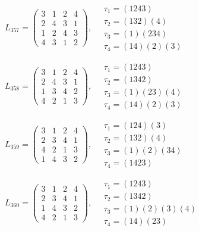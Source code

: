 $L_{357} = \begin{pmatrix} 3 & 1 & 2 & 4 \\ 2 & 4 & 3 & 1 \\ 1 & 2 & 4 & 3 \\ 4 & 3 & 1 & 2 \end{pmatrix}, \quad \begin{matrix} \tau_{1} = (1 2 4 3) \\ \tau_{2} = (1 3 2)(4) \\ \tau_{3} = (1)(2 3 4) \\ \tau_{4} = (1 4)(2)(3) \end{matrix}$

$L_{358} = \begin{pmatrix} 3 & 1 & 2 & 4 \\ 2 & 4 & 3 & 1 \\ 1 & 3 & 4 & 2 \\ 4 & 2 & 1 & 3 \end{pmatrix}, \quad \begin{matrix} \tau_{1} = (1 2 4 3) \\ \tau_{2} = (1 3 4 2) \\ \tau_{3} = (1)(2 3)(4) \\ \tau_{4} = (1 4)(2)(3) \end{matrix}$

$L_{359} = \begin{pmatrix} 3 & 1 & 2 & 4 \\ 2 & 3 & 4 & 1 \\ 4 & 2 & 1 & 3 \\ 1 & 4 & 3 & 2 \end{pmatrix}, \quad \begin{matrix} \tau_{1} = (1 2 4)(3) \\ \tau_{2} = (1 3 2)(4) \\ \tau_{3} = (1)(2)(3 4) \\ \tau_{4} = (1 4 2 3) \end{matrix}$

$L_{360} = \begin{pmatrix} 3 & 1 & 2 & 4 \\ 2 & 3 & 4 & 1 \\ 1 & 4 & 3 & 2 \\ 4 & 2 & 1 & 3 \end{pmatrix}, \quad \begin{matrix} \tau_{1} = (1 2 4 3) \\ \tau_{2} = (1 3 4 2) \\ \tau_{3} = (1)(2)(3)(4) \\ \tau_{4} = (1 4)(2 3) \end{matrix}$

